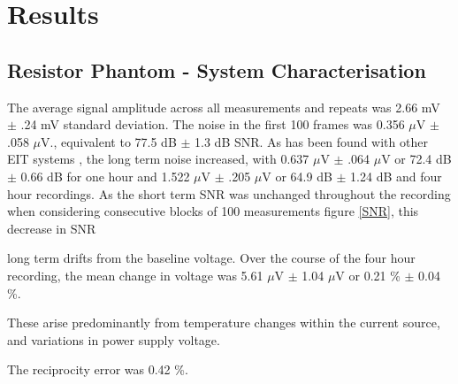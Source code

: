 \section{Results}
\subsection{Resistor Phantom - System Characterisation}
The average signal amplitude across all measurements and repeats was 2.66 mV $\pm$ .24 mV standard deviation. The noise in the first 100 frames was 0.356 $\mu$V $\pm$ .058 $\mu$V., equivalent to 77.5 dB $\pm$ 1.3 dB SNR. As has been found with other EIT systems \cite{oh2007multi}, the long term noise increased, with 0.637 $\mu$V $\pm$ .064 $\mu$V or 72.4 dB $\pm$ 0.66 dB for one hour and 1.522 $\mu$V $\pm$ .205 $\mu$V or 64.9 dB $\pm$ 1.24 dB and four hour recordings. As the short term SNR was unchanged throughout the recording when considering consecutive blocks of 100 measurements figure \ref{SNR}, this decrease in SNR 


long term drifts from the baseline voltage. Over the course of the four hour recording, the mean change in voltage was 5.61 $\mu$V $\pm$ 1.04 $\mu$V or 0.21 \% $\pm$ 0.04 \%. 


These arise predominantly from temperature changes within the current source, and variations in power supply voltage.

The reciprocity error was 0.42 \%. 
